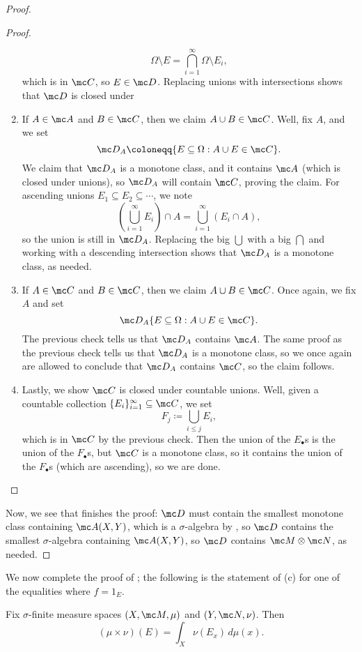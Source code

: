 \documentclass[../notes.tex]{subfiles}
\begin{document}
\begin{proof}
\begin{proof}
\begin{enumerate}
			\[\Omega\setminus E=\bigcap_{i=1}^\infty\Omega\setminus E_i,\]
			which is in $\mc C$, so $E\in\mc D$. Replacing unions with intersections shows that $\mc D$ is closed under 
			\item If $A\in\mc A$ and $B\in\mc C$, then we claim $A\cup B\in\mc C$. Well, fix $A$, and we set
			\[\mc D_A\coloneqq\{E\subseteq\Omega:A\cup E\in\mc C\}.\]
			We claim that $\mc D_A$ is a monotone class, and it contains $\mc A$ (which is closed under unions), so $\mc D_A$ will contain $\mc C$, proving the claim. For ascending unions $E_1\subseteq E_2\subseteq\cdots$, we note
			\[\left(\bigcup_{i=1}^\infty E_i\right)\cap A=\bigcup_{i=1}^\infty (E_i\cap A),\]
			so the union is still in $\mc D_A$. Replacing the big $\bigcup$ with a big $\bigcap$ and working with a descending intersection shows that $\mc D_A$ is a monotone class, as needed.
			\item If $A\in\mc C$ and $B\in\mc C$, then we claim $A\cup B\in\mc C$. Once again, we fix $A$ and set
			\[\mc D_A\{E\subseteq\Omega:A\cup E\in\mc C\}.\]
			The previous check tells us that $\mc D_A$ contains $\mc A$. The same proof as the previous check tells us that $\mc D_A$ is a monotone class, so we once again are allowed to conclude that $\mc D_A$ contains $\mc C$, so the claim follows.
			\item Lastly, we show $\mc C$ is closed under countable unions. Well, given a countable collection $\{E_i\}_{i=1}^\infty\subseteq\mc C$, we set
			\[F_j\coloneqq\bigcup_{i\le j}E_i,\]
			which is in $\mc C$ by the previous check. Then the union of the $E_\bullet$s is the union of the $F_\bullet$s, but $\mc C$ is a monotone class, so it contains the union of the $F_\bullet$s (which are ascending), so we are done.
			\qedhere
		\end{enumerate}
	\end{proof}
	Now, we see that  finishes the proof: $\mc D$ must contain the smallest monotone class containing $\mc A(X,Y)$, which is a $\sigma$-algebra by , so $\mc D$ contains the smallest $\sigma$-algebra containing $\mc A(X,Y)$, so $\mc D$ contains $\mc M\otimes\mc N$, as needed.
\end{proof}
We now complete the proof of ; the following is the statement of (c) for one of the equalities where $f=1_E$.
\begin{lemma}
	Fix $\sigma$-finite measure spaces $(X,\mc M,\mu)$ and $(Y,\mc N,\nu)$. Then
	\[(\mu\times\nu)(E)=\int_X\nu(E_x)\,d\mu(x).\]
\end{lemma}
\end{document}
